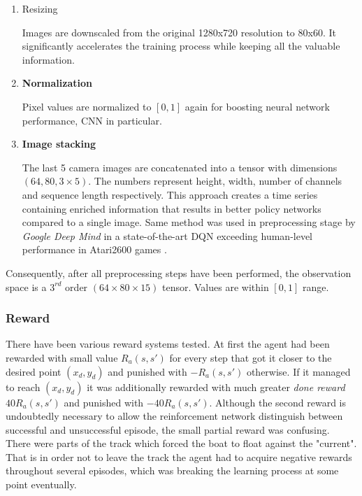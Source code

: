 \begin{enumerate}
    \item{Resizing}
    
    Images are downscaled from the original 1280x720 resolution to 80x60. It significantly accelerates the training process while keeping all the valuable information.
    
    \item \textbf{Normalization}

    Pixel values are normalized to $[0, 1]$ again for boosting neural network performance, CNN in particular.
    
    \item \textbf{Image stacking}
    
    The last 5 camera images are concatenated into a tensor with dimensions $(64, 80, 3 \times 5)$. The numbers represent height, width, number of channels and sequence length respectively. This approach creates a time series containing enriched information that results in better policy networks compared to a single image. Same method was used in preprocessing stage by \emph{Google Deep Mind} in a state-of-the-art DQN exceeding human-level performance in Atari2600 games \cite{DQNAtari}.
\end{enumerate}

Consequently, after all preprocessing steps have been performed, the observation space is a $3^{rd}$ order $(64 \times 80 \times 15)$ tensor. Values are within $[0, 1]$ range.

\subsubsection*{Reward}
\label{sub2:reward}

There have been various reward systems tested. At first the agent had been rewarded with small value $R_a(s, s')$ for every step that got it closer to the desired point $(x_d, y_d)$ and punished with $-R_a(s, s')$ otherwise. If it managed to reach $(x_d, y_d)$ it was additionally rewarded with much greater \emph{done reward} $40R_a(s, s')$ and punished with $-40R_a(s, s')$. Although the second reward is undoubtedly necessary to allow the reinforcement network distinguish between successful and unsuccessful episode, the small partial reward was confusing. There were parts of the track which forced the boat to float against the "current". That is in order not to leave the track the agent had to acquire negative rewards throughout several episodes, which was breaking the learning process at some point eventually.

